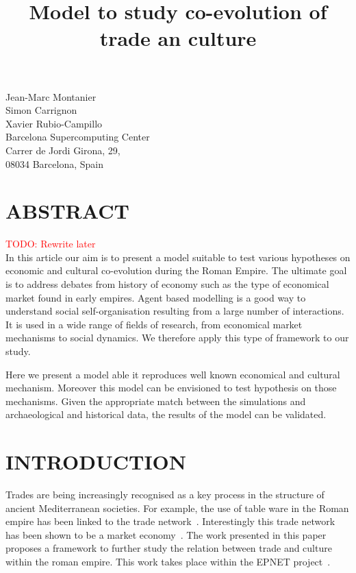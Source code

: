 \documentclass{wscpaperproc}
\newcommand{\memo}[2]{\textcolor{#1}{#2}}
\newcommand{\todo}[1]{\memo{red}{TODO: #1\\}}
\begin{document}

\title{Model to study co-evolution of trade an culture}
\maketitle

\begin{figure*}[htb]
{
\centering
Jean-Marc Montanier\\
Simon Carrignon\\ 
Xavier Rubio-Campillo\\
\vspace{12pt}
Barcelona Supercomputing Center\\
Carrer de Jordi Girona, 29, \\
08034 Barcelona, Spain\\
}
\end{figure*}







\section*{ABSTRACT}

\todo{Rewrite later}
In this article our aim is to present a model suitable to test various hypotheses on economic and cultural co-evolution during the Roman Empire. The ultimate goal is to address debates from history of economy such as the type of economical market found in early empires. Agent based modelling is a good way to understand social self-organisation resulting from a large number of interactions. It is used in a wide range of fields of research, from economical market mechanisms to social dynamics. We therefore apply this type of framework to our study.

Here we present a model able it reproduces well known economical and cultural mechanism. Moreover this model can be envisioned to test hypothesis on those mechanisms. Given the appropriate match between the simulations and archaeological and historical data, the results of the model can be validated.


\section{INTRODUCTION}

Trades are being increasingly recognised as a key process in the structure of ancient Mediterranean societies. For example, the use of table ware in the Roman empire  has been linked to the trade network~\cite{brughmans_connecting_2010}. Interestingly this trade network has been shown to be a market economy~\cite{temin_market_2001}. The work presented in this paper proposes a framework to further study the relation between trade and culture within the roman empire. This work takes place within the EPNET project~\cite{remesal_epnet_2014}.
\end{document}
